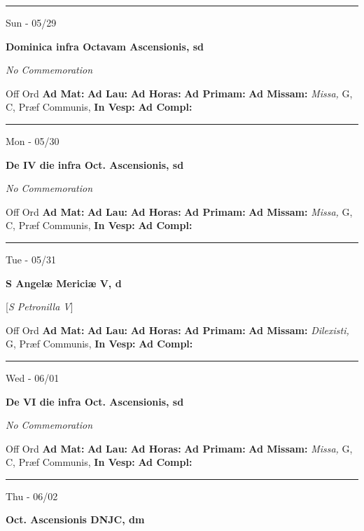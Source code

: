 \documentclass[letterpaper, 10pt]{article}
\begin{document}
\hrule
\begin{center}
Sun - 05/29
\end{center}\textbf{ \large Dominica infra Octavam Ascensionis, \textnormal{\normalsize sd}}

\textit{No Commemoration}\begin{justify}
Off Ord
\textbf{Ad Mat: }
\textbf{Ad Lau: }
\textbf{Ad Horas: }
\textbf{Ad Primam: }
\textbf{Ad Missam:} \textit{Missa, } G, C, Præf Communis, 
\textbf{In Vesp: }
\textbf{Ad Compl: }\end{justify}



\hrule
\begin{center}
Mon - 05/30
\end{center}\textbf{ \large De IV die infra Oct. Ascensionis, \textnormal{\normalsize sd}}

\textit{No Commemoration}\begin{justify}
Off Ord
\textbf{Ad Mat: }
\textbf{Ad Lau: }
\textbf{Ad Horas: }
\textbf{Ad Primam: }
\textbf{Ad Missam:} \textit{Missa, } G, C, Præf Communis, 
\textbf{In Vesp: }
\textbf{Ad Compl: }\end{justify}



\hrule
\begin{center}
Tue - 05/31
\end{center}\textbf{ \large S Angelæ Mericiæ V, \textnormal{\normalsize d}}

[\textit{S Petronilla V}]
\begin{justify}
Off Ord
\textbf{Ad Mat: }
\textbf{Ad Lau: }
\textbf{Ad Horas: }
\textbf{Ad Primam: }
\textbf{Ad Missam:} \textit{Dilexisti, } G, Præf Communis, 
\textbf{In Vesp: }
\textbf{Ad Compl: }\end{justify}



\hrule
\begin{center}
Wed - 06/01
\end{center}\textbf{ \large De VI die infra Oct. Ascensionis, \textnormal{\normalsize sd}}

\textit{No Commemoration}\begin{justify}
Off Ord
\textbf{Ad Mat: }
\textbf{Ad Lau: }
\textbf{Ad Horas: }
\textbf{Ad Primam: }
\textbf{Ad Missam:} \textit{Missa, } G, C, Præf Communis, 
\textbf{In Vesp: }
\textbf{Ad Compl: }\end{justify}



\hrule
\begin{center}
Thu - 06/02
\end{center}\textbf{ \large Oct. Ascensionis DNJC, \textnormal{\normalsize dm}}
\end{document}
